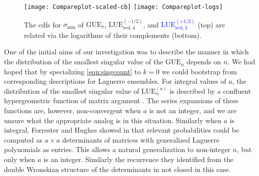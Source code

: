 \documentclass[pdftex, oneside, 10pt, letterpaper]{amsart}
\theoremstyle{plain}
\theoremstyle{definition}
\theoremstyle{remark}
\begin{document}
\begin{figure}
\hspace*{\fill}\texttt{[image: Compareplot-scaled-cb]}\hspace{\fill}\mbox{}
\hspace*{\fill}\texttt{[image: Compareplot-logs]}\hspace{\fill}\mbox{}
\caption{The cdfs for $\sigma_{\min}$ of \textcolor{BrickRed}{${\ensuremath{\mathrm{GUE}}}{}_7$},
  \textcolor{OliveGreen}{${\ensuremath{\mathrm{LUE}}}_{\mathrm{svd},4}^{(-1/2)}$}, and
  \textcolor{blue}{${\ensuremath{\mathrm{LUE}}}_{\mathrm{svd},3}^{(+1/2)}$} (top) are related
  via the logarithms of their complements (bottom).
}\label{fig:minimumsing}
\end{figure}

One of the initial aims of our investigation was to describe the
manner in which the distribution of the smallest singular value of the
${\ensuremath{\mathrm{GUE}}}_n$ depends on $n$.  We had hoped that by specializing
\eqref{eqn:singcount} to $k=0$ we could bootstrap from corresponding
descriptions for Laguerre ensembles.  For integral values of $a$, the
distribution of the smallest singular value of ${\ensuremath{\mathrm{LUE}}}_n^{(a)}$ is
described by a confluent hypergeometric function of matrix argument
\cite{Du-Thesis, KoEd}.  The series expansions of these functions are,
however, non-convergent when $a$ is not an integer, and we are unsure
what the appropriate analog is in this situation.  Similarly when $a$
is integral, Forrester and Hughes showed in \cite{FoHu} that relevant
probabilities could be computed as $a\times{}a$ determinants of
matrices with generalized Laguerre polynomials as entries.  This
allows a natural generalization to non-integer $n$, but only when $a$
is an integer.  Similarly the recurrence they identified from the
double Wronskian structure of the determinants in not closed in this
case.
\end{document}
